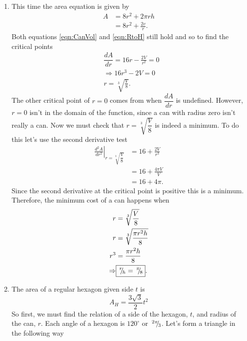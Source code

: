 \documentclass{hwset}
\begin{document}
\begin{enumerate}
  \item \begin{solution}
    This time the area equation is given by
    \begin{align*}
      A &= 8r^2 + 2\pi r h \\
      &= 8r^2 + \frac{2v}{r} .
    \end{align*}
    Both equations \eqref{eqn:CanVol} and \eqref{eqn:RtoH} still hold and so to
    find the critical points
    \begin{align*}
      & \dfrac{dA}{dr} = 16 r - \frac{2V}{r^2} = 0 \\
      & \Rightarrow 16 r^3 - 2V = 0 \\
      & r = \sqrt[3]{\frac{V}{8}}.
    \end{align*}
    The other critical point of $r=0$ comes from when $\dfrac{dA}{dr}$ is
    undefined. However, $r=0$ isn't in the domain of the function, since a can
    with radius zero isn't really a can. Now we must check that
    $r=\sqrt[3]{\dfrac{V}{8}}$ is indeed a minimum. To do this let's use the
    second derivative test
    \begin{align*}
      \left.\frac{d^2A}{dr^2}\right|_{r=\sqrt[3]{\dfrac{V}{8}}} &= 16 + \frac{2V}{r^3} \\
      &= 16 + \frac{4\pi V}{V} \\
      &= 16 + 4\pi.
    \end{align*}
    Since the second derivative at the critical point is positive this is a
    minimum. Therefore, the minimum cost of a can happens when
    \begin{align*}
      r &= \sqrt[3]{\frac{V}{8}} \\
      r &= \sqrt[3]{\frac{\pi r^2 h}{8}} \\
      r^3 &= \frac{\pi r^2 h}{8} \\
      \Rightarrow &\boxed{\,^{r}\!\!/\!_{h}=\,^{\pi}\!\!/\!_{8}}.
    \end{align*}
  \end{solution}
  \item \begin{solution}
    The area of a regular hexagon given side $t$ is 
    \begin{equation*}
      A_H = \frac{3\sqrt{3}}{2} t^2
    \end{equation*}
    So first, we must find the relation of a side of the hexagon, $t$, and
    radius of the can, $r$.  Each angle of a hexagon is $120^\circ$ or
    $\,^{2\pi}\!\!/\!_{3}$. Let's form a triangle in the following way
    \begin{center}

\end{center}
\end{solution}
\end{enumerate}
\end{document}
